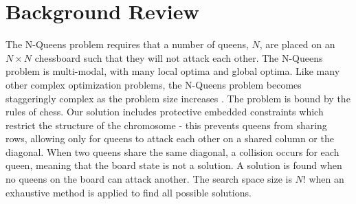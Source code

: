 \documentclass[conference]{IEEEtran}
\begin{document}
\section{Background Review}
The N-Queens problem requires that a number of queens, $N$, are placed on an $N \times N$ chessboard such that they will not attack each other. The N-Queens problem is multi-modal, with many local optima and global optima. Like many other complex optimization problems, the N-Queens problem becomes staggeringly complex as the problem size increases \cite{cit:3}. The problem is bound by the rules of chess. Our solution includes protective embedded constraints which restrict the structure of the chromosome - this prevents queens from sharing rows, allowing only for queens to attack each other on a shared column or the diagonal. When two queens share the same diagonal, a collision occurs for each queen, meaning that the board state is not a solution. A solution is found when no queens on the board can attack another. The search space size is {$N!$} when an exhaustive method is applied to find all possible solutions. 
\end{document}
